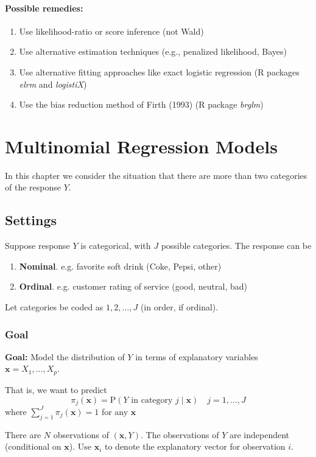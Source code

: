 \documentclass[11pt]{elegantbook}
\begin{document}
\subsubsection*{Possible remedies:}
\begin{enumerate}[1.]
    \item Use likelihood-ratio or score inference (not Wald)
    \item Use alternative estimation techniques (e.g., penalized likelihood, Bayes)
    \item Use alternative fitting approaches like exact logistic regression (R packages \textit{elrm} and \textit{logistiX})
    \item Use the bias reduction method of Firth (1993) (R package \textit{brglm})
\end{enumerate}




\chapter{Multinomial Regression Models}
In this chapter we consider the situation that there are more than two categories of the response $Y$.

\section{Settings}
Suppose response $Y$ is categorical, with $J$ possible categories. The response can be
\begin{enumerate}[$\bullet$]
    \item \textbf{Nominal}. e.g. favorite soft drink (Coke, Pepsi, other)
    \item \textbf{Ordinal}. e.g. customer rating of service (good, neutral, bad)
\end{enumerate}
Let categories be coded as $1, 2, . . . , J$ (in order, if ordinal).

\subsection{Goal}
\textbf{Goal:} Model the distribution of $Y$ in terms of explanatory variables $\boldsymbol{x}=X_1,...,X_p$.

That is, we want to predict
$$
\pi_j(\boldsymbol{x})=\mathrm{P}(Y \text { in category } j \mid \boldsymbol{x}) \quad j=1, \ldots, J
$$
where $\sum_{j=1}^J \pi_j(\boldsymbol{x})=1$ for any $\boldsymbol{x}$

There are $N$ observations of $(\boldsymbol{x},Y)$. The observations of $Y$ are independent (conditional on $\boldsymbol{x}$). Use $\boldsymbol{x}_i$ to denote the explanatory vector for observation $i$.
\end{document}
